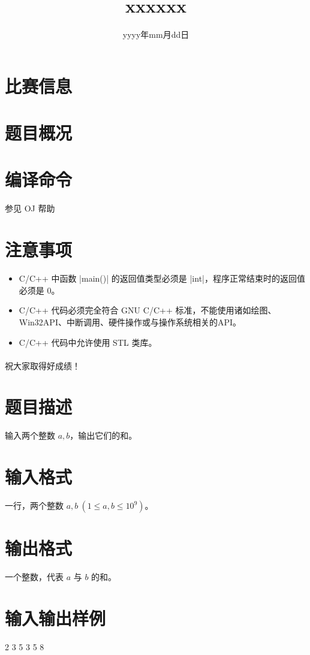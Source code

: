 \documentclass{ctpro}
\title{xxxxxx}
\date{yyyy年mm月dd日}
\begin{document}
\MakeShortVerb{|}

\maketitle
{}

\section*{比赛信息}


\section*{题目概况}

\problemtab

\section*{编译命令}

参见 OJ 帮助

\section*{注意事项}

\begin{itemize}
	\item C/C++ 中函数 |main()| 的返回值类型必须是 |int|，程序正常结束时的返回值必须是 0。
	\item C/C++ 代码必须完全符合 GNU C/C++ 标准，不能使用诸如绘图、Win32API、中断调用、硬件操作或与操作系统相关的API。
	\item C/C++ 代码中允许使用 STL 类库。
\end{itemize}

\paragraph*{} 祝大家取得好成绩！

\makeproblem
\section*{题目描述}

输入两个整数 $a,b$，输出它们的和。

\section*{输入格式}

一行，两个整数 $a,b~(1 \leq a,b \leq 10^9)$。

\section*{输出格式}

一个整数，代表 $a$ 与 $b$ 的和。

\section*{输入输出样例}

\testcasetab
{
	2 3
}
{
	5
}
\testcasetab
{
	3 5
}
{
	8
}
\end{document}
